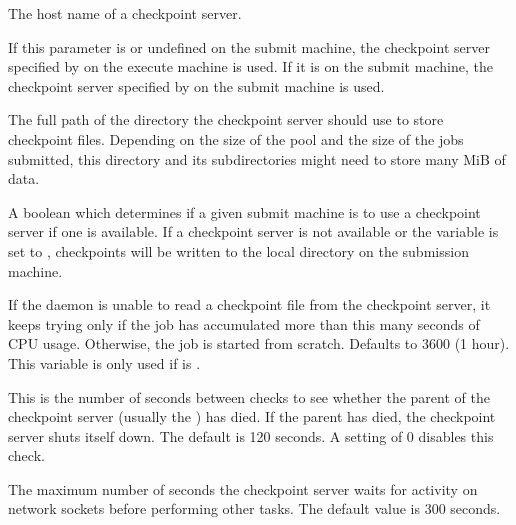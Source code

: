 \begin{description}
  
\label{param:CkptServerHost}
\item[\Macro{CKPT\_SERVER\_HOST}]
  The host name of a checkpoint server.

\label{param:StarterChoosesCkptServer}
\item[\Macro{STARTER\_CHOOSES\_CKPT\_SERVER}]
  If this parameter is  or undefined on
  the submit machine, the checkpoint server specified by
   on the execute machine is used.  If it is
   on the submit machine, the checkpoint server
  specified by  on the submit machine is
  used.
  
\label{param:CkptServerDir}
\item[\Macro{CKPT\_SERVER\_DIR}]
  The full path of the
  directory the checkpoint server should use to store checkpoint files.
  Depending on the size of the pool and the size of the jobs submitted,
  this directory and its subdirectories might
  need to store many MiB of data.

\label{param:UseCkptServer}
\item[\Macro{USE\_CKPT\_SERVER}]
  A boolean which determines if a given submit machine is to use a
  checkpoint server if one is available.  If a
  checkpoint server is not available or the variable 
  is set to ,
  checkpoints will be written to the local  directory on
  the submission machine.

\label{param:MaxDiscardedRunTime}
\item[\Macro{MAX\_DISCARDED\_RUN\_TIME}]
  If the  daemon is unable to read a
  checkpoint file from the checkpoint server, it keeps trying only if
  the job has accumulated more than this many seconds of CPU usage.
  Otherwise, the job is started from scratch.  
  Defaults to 3600 (1 hour). 
  This variable is only used if  is .

\label{param:CkptServerCheckParentInterval}
\item[\Macro{CKPT\_SERVER\_CHECK\_PARENT\_INTERVAL}]
  This is the number of seconds between checks to see whether the parent
  of the checkpoint server (usually the ) has died.  If the
  parent has died, the checkpoint server shuts itself down.
  The default is 120 seconds.
  A setting of 0 disables this check.

\label{param:CkptServerInterval}
\item[\Macro{CKPT\_SERVER\_INTERVAL}]
  The maximum number of seconds the checkpoint server
  waits for activity on network sockets before performing other
  tasks. The default value is 300 seconds.


\end{description}
